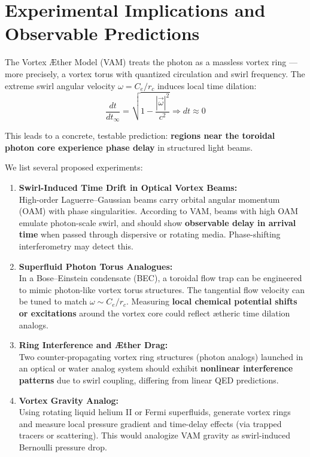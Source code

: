 \section{Experimental Implications and Observable Predictions}

        The Vortex \AE ther Model (VAM) treats the photon as a massless vortex ring — more precisely, a vortex torus with quantized circulation and swirl frequency. The extreme swirl angular velocity \( \omega = C_e / r_c \) induces local time dilation:
        \begin{equation}
            \frac{dt}{dt_\infty} = \sqrt{1 - \frac{|\vec{\omega}|^2}{c^2}} \Rightarrow dt \approx 0
        \end{equation}

        This leads to a concrete, testable prediction: \textbf{regions near the toroidal photon core experience phase delay} in structured light beams.

        We list several proposed experiments:

        \begin{enumerate}
            \item \textbf{Swirl-Induced Time Drift in Optical Vortex Beams:}\\
            High-order Laguerre–Gaussian beams carry orbital angular momentum (OAM) with phase singularities. According to VAM, beams with high OAM emulate photon-scale swirl, and should show \textbf{observable delay in arrival time} when passed through dispersive or rotating media. Phase-shifting interferometry may detect this.

            \item \textbf{Superfluid Photon Torus Analogues:}\\
            In a Bose–Einstein condensate (BEC), a toroidal flow trap can be engineered to mimic photon-like vortex torus structures. The tangential flow velocity can be tuned to match \( \omega \sim C_e / r_c \). Measuring \textbf{local chemical potential shifts or excitations} around the vortex core could reflect ætheric time dilation analogs.

            \item \textbf{Ring Interference and Æther Drag:}\\
            Two counter-propagating vortex ring structures (photon analogs) launched in an optical or water analog system should exhibit \textbf{nonlinear interference patterns} due to swirl coupling, differing from linear QED predictions.

            \item \textbf{Vortex Gravity Analog:}\\
            Using rotating liquid helium II or Fermi superfluids, generate vortex rings and measure local pressure gradient and time-delay effects (via trapped tracers or scattering). This would analogize VAM gravity as swirl-induced Bernoulli pressure drop.
        \end{enumerate}

